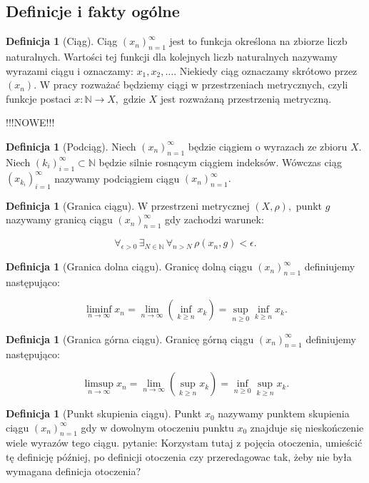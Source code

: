 \documentclass[licencjacka]{pwr_wmat_praca_dyplomowa}
\theoremstyle{plain}
\numberwithin{theorem}{chapter}
\theoremstyle{definition}
\numberwithin{theorem}{chapter}
\newtheorem{definition}[theorem]{Definicja}
\begin{document}


\subsection{Definicje i fakty ogólne}

\begin{definition}[Ciąg]
Ciąg $(x_n)_{n=1}^{\infty}$ jest to funkcja określona na zbiorze liczb naturalnych. Wartości tej funkcji dla kolejnych liczb naturalnych nazywamy wyrazami ciągu i oznaczamy: $x_1, x_2, \ldots$. Niekiedy ciąg oznaczamy skrótowo przez $(x_n)$. W pracy rozważać będziemy ciągi w przestrzeniach metrycznych, czyli funkcje postaci $x: \mathbb{N} \rightarrow X,$ gdzie $X$ jest rozważaną przestrzenią metryczną.
\end{definition}

{\color{red} !!!NOWE!!!
\begin{definition}[Podciąg]
Niech $(x_n)_{n=1}^{\infty}$ będzie ciągiem o wyrazach ze zbioru $X$. Niech $(k_i)_{i=1}^{\infty} \subset \mathbb{N}$ będzie silnie rosnącym ciągiem indeksów. Wówczas ciąg $(x_{k_i})_{i=1}^{\infty}$ nazywamy podciągiem ciągu $(x_n)_{n=1}^{\infty}.$
\end{definition}

\begin{definition}[Granica ciągu]
W przestrzeni metrycznej $(X, \rho),$ punkt $g$ nazywamy granicą ciągu $(x_n)_{n=1}^\infty$ gdy zachodzi warunek:

$$\forall_{\epsilon>0} \, \exists_{N \in \mathbb{N}} \, \forall_{n>N} \, \rho(x_n, g) < \epsilon.$$
\end{definition}


\begin{definition}[Granica dolna ciągu]
Granicę dolną ciągu $(x_n)_{n=1}^\infty$ definiujemy następująco:

$$\liminf_{n \rightarrow \infty} x_n = \lim_{n \rightarrow \infty} \left(\inf_{k \geq n} x_k\right) = \sup_{n \geq 0} \inf_{k \geq n} x_k.$$
\end{definition}

\begin{definition}[Granica górna ciągu]
Granicę górną ciągu $(x_n)_{n=1}^\infty$ definiujemy następująco:

$$\limsup_{n \rightarrow \infty} x_n = \lim_{n \rightarrow \infty} \left(\sup_{k \geq n} x_k\right) = \inf_{n \geq 0} \sup_{k \geq n} x_k.$$
\end{definition}

\begin{definition}[Punkt skupienia ciągu]
Punkt $x_0$ nazywamy punktem skupienia ciągu $(x_n)_{n=1}^{\infty}$ gdy w dowolnym otoczeniu punktu $x_0$ znajduje się nieskończenie wiele wyrazów tego ciągu. {\color{blue} pytanie: Korzystam tutaj z pojęcia otoczenia, umieścić tę definicję później, po definicji otoczenia czy przeredagowac tak, żeby nie była wymagana definicja otoczenia?}
\end{definition}
}
\end{document}

